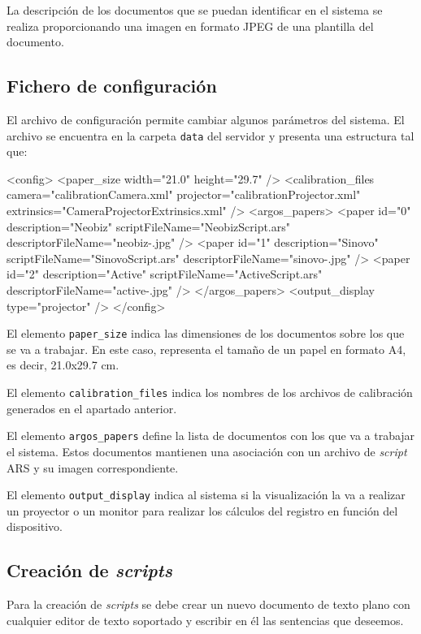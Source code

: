 La descripción de los documentos que se puedan identificar en el sistema se realiza proporcionando
una imagen en formato JPEG de una plantilla del documento.

\subsection{Fichero de configuración}

El archivo de configuración permite cambiar algunos parámetros del sistema. El archivo se encuentra
en la carpeta \texttt{data} del servidor y presenta una estructura tal que:

\begin{listing}[%
  language = XML]
<config>
  <paper_size width="21.0" height="29.7" />
  <calibration_files camera="calibrationCamera.xml"
    projector="calibrationProjector.xml"
    extrinsics="CameraProjectorExtrinsics.xml" />
  <argos_papers>
    <paper id="0" description="Neobiz"
      scriptFileName="NeobizScript.ars"
      descriptorFileName="neobiz-.jpg" />
    <paper id="1" description="Sinovo"
      scriptFileName="SinovoScript.ars"
      descriptorFileName="sinovo-.jpg" />
    <paper id="2" description="Active"
      scriptFileName="ActiveScript.ars"
      descriptorFileName="active-.jpg" />
  </argos_papers>
  <output_display type="projector" />
</config>
\end{listing}

El elemento \texttt{paper\_size} indica las dimensiones de los documentos sobre los que se va a
trabajar. En este caso, representa el tamaño de un papel en formato A4, es decir, 21.0x29.7 cm.

El elemento \texttt{calibration\_files} indica los nombres de los archivos de calibración generados
en el apartado anterior.

El elemento \texttt{argos\_papers} define la lista de documentos con los que va a trabajar el
sistema. Estos documentos mantienen una asociación con un archivo de \textit{script} ARS y su
imagen correspondiente.

El elemento \texttt{output\_display} indica al sistema si la visualización la va a realizar un
proyector o un monitor para realizar los cálculos del registro en función del dispositivo.

\subsection{Creación de \textit{scripts}}

Para la creación de \textit{scripts} se debe crear un nuevo documento de texto plano con cualquier
editor de texto soportado y escribir en él las sentencias que deseemos.

